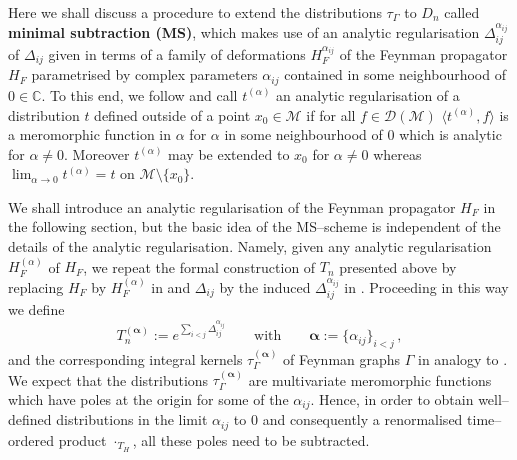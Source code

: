 \documentclass[10pt]{book}
\newcommand{\Dcal}{\mathcal{D}}
\newcommand{\Mcal}{\mathcal{M}}
\theoremstyle{break}
\begin{document}
Here we shall discuss a procedure to extend the distributions $\tau_\Gamma$ to $D_n$ called {\bf minimal subtraction (MS)}, which makes use of an analytic regularisation $\Delta^{\alpha_{ij}}_{ij}$ of $\Delta_{ij}$ given in terms of a family of deformations $H_F^{\alpha_{ij}}$ of the Feynman propagator $H_F$ parametrised by complex parameters $\alpha_{ij}$ contained in some neighbourhood of $0\in\mathbb{C}$. To this end, we follow %
and call $t^{(\alpha)}$ an analytic regularisation of a distribution $t$ defined outside of a point $x_0\in\Mcal$ if for all $f\in\Dcal(\Mcal)$ $\langle t^{(\alpha)}, f\rangle$ is a meromorphic function in $\alpha$ for $\alpha$ in some neighbourhood of $0$ which is analytic for $\alpha\neq 0$. Moreover $t^{(\alpha)}$ may be extended to $x_0$ for $\alpha\neq 0$ whereas $\lim_{\alpha\to 0}t^{(\alpha)}=t$ on $\Mcal\setminus\{x_0\}$.

We shall introduce an analytic regularisation of the Feynman propagator $H_F$ in the following section, but the basic idea of the MS--scheme is independent of the details of the analytic regularisation. Namely, given 
any analytic regularisation $H^{(\alpha)}_F$ of $H_F$, we repeat the formal construction of $T_n$ presented above by replacing $H_F$ by $H^{(\alpha)}_F$ in %
and $\Delta_{ij}$ by the induced $\Delta^{\alpha_{ij}}_{ij}$ in %
. Proceeding in this way we define 
\[
T^{(\boldsymbol{\alpha})}_n := e^{\sum_{i<j}\Delta^{\alpha_{ij}}_{ij}} \qquad \text{with}\qquad \boldsymbol{\alpha} := \{\alpha_{ij}\}_{i<j}\,,
\]
and the corresponding integral kernels $\tau^{(\boldsymbol{\alpha})}_\Gamma$ of Feynman graphs $\Gamma$ in analogy to %
. We expect that the distributions $\tau^{(\boldsymbol{\alpha})}_\Gamma$ are multivariate meromorphic functions which have poles at the origin for some of the $\alpha_{ij}$. 
Hence, in order to obtain well--defined distributions in the limit $\alpha_{ij}$ to $0$ and consequently a renormalised time--ordered product $\cdot_{T_H}$, all these poles need to be subtracted.
\end{document}
